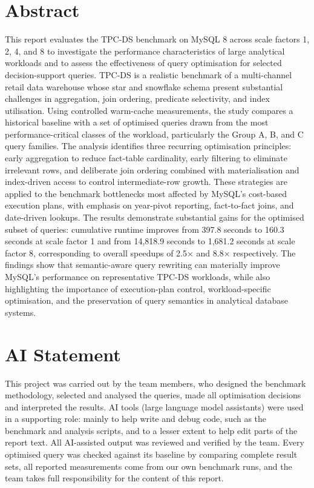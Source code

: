 \documentclass{ULBreport}
\begin{document}
\chapter*{Abstract}

This report evaluates the TPC-DS benchmark on MySQL 8 across scale factors 1, 2, 4, and 8 to investigate the performance characteristics of large analytical workloads and to assess the effectiveness of query optimisation for selected decision-support queries. TPC-DS is a realistic benchmark of a multi-channel retail data warehouse whose star and snowflake schema present substantial challenges in aggregation, join ordering, predicate selectivity, and index utilisation. Using controlled warm-cache measurements, the study compares a historical baseline with a set of optimised queries drawn from the most performance-critical classes of the workload, particularly the Group A, B, and C query families. The analysis identifies three recurring optimisation principles: early aggregation to reduce fact-table cardinality, early filtering to eliminate irrelevant rows, and deliberate join ordering combined with materialisation and index-driven access to control intermediate-row growth. These strategies are applied to the benchmark bottlenecks most affected by MySQL's cost-based execution plans, with emphasis on year-pivot reporting, fact-to-fact joins, and date-driven lookups. The results demonstrate substantial gains for the optimised subset of queries: cumulative runtime improves from 397.8 seconds to 160.3 seconds at scale factor 1 and from 14,818.9 seconds to 1,681.2 seconds at scale factor 8, corresponding to overall speedups of 2.5× and 8.8× respectively. The findings show that semantic-aware query rewriting can materially improve MySQL’s performance on representative TPC-DS workloads, while also highlighting the importance of execution-plan control, workload-specific optimisation, and the preservation of query semantics in analytical database systems.

\chapter*{AI Statement}

This project was carried out by the team members, who designed the benchmark methodology, selected and analysed the queries, made all optimisation decisions and interpreted the results. AI tools (large language model assistants) were used in a supporting role: mainly to help write and debug code, such as the benchmark and analysis scripts, and to a lesser extent to help edit parts of the report text. All AI-assisted output was reviewed and verified by the team. Every optimised query was checked against its baseline by comparing complete result sets, all reported measurements come from our own benchmark runs, and the team takes full responsibility for the content of this report.
\end{document}
